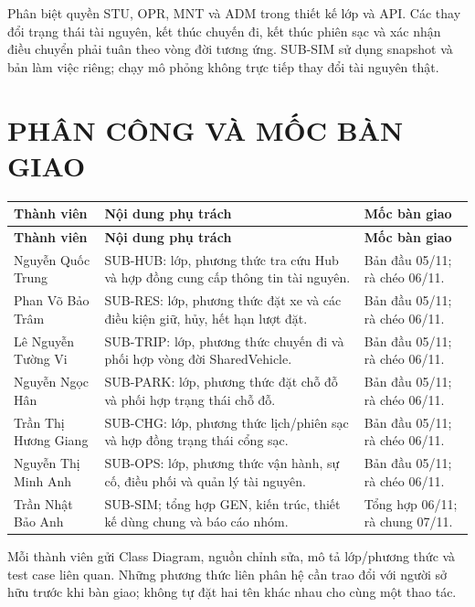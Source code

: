\documentclass[10pt,a4paper]{article}
\begin{document}
Phân biệt quyền STU, OPR, MNT và ADM trong thiết kế lớp và API. Các thay đổi trạng thái tài nguyên, kết thúc chuyến đi, kết thúc phiên sạc và xác nhận điều chuyển phải tuân theo vòng đời tương ứng. SUB-SIM sử dụng snapshot và bản làm việc riêng; chạy mô phỏng không trực tiếp thay đổi tài nguyên thật.

\section{PHÂN CÔNG VÀ MỐC BÀN GIAO}
\begin{longtable}{|L{35mm}|L{66mm}|L{45mm}|}
\hline
{}\textbf{Thành viên} & \textbf{Nội dung phụ trách} & \textbf{Mốc bàn giao}\\\hline
\endfirsthead
\hline\textbf{Thành viên} & \textbf{Nội dung phụ trách} & \textbf{Mốc bàn giao}\\\hline\endhead
Nguyễn Quốc Trung & SUB-HUB: lớp, phương thức tra cứu Hub và hợp đồng cung cấp thông tin tài nguyên. & Bản đầu 05/11; rà chéo 06/11.\\\hline
Phan Võ Bảo Trâm & SUB-RES: lớp, phương thức đặt xe và các điều kiện giữ, hủy, hết hạn lượt đặt. & Bản đầu 05/11; rà chéo 06/11.\\\hline
Lê Nguyễn Tường Vi & SUB-TRIP: lớp, phương thức chuyến đi và phối hợp vòng đời SharedVehicle. & Bản đầu 05/11; rà chéo 06/11.\\\hline
Nguyễn Ngọc Hân & SUB-PARK: lớp, phương thức đặt chỗ đỗ và phối hợp trạng thái chỗ đỗ. & Bản đầu 05/11; rà chéo 06/11.\\\hline
Trần Thị Hương Giang & SUB-CHG: lớp, phương thức lịch/phiên sạc và hợp đồng trạng thái cổng sạc. & Bản đầu 05/11; rà chéo 06/11.\\\hline
Nguyễn Thị Minh Anh & SUB-OPS: lớp, phương thức vận hành, sự cố, điều phối và quản lý tài nguyên. & Bản đầu 05/11; rà chéo 06/11.\\\hline
Trần Nhật Bảo Anh & SUB-SIM; tổng hợp GEN, kiến trúc, thiết kế dùng chung và báo cáo nhóm. & Tổng hợp 06/11; rà chung 07/11.\\\hline
\end{longtable}

Mỗi thành viên gửi Class Diagram, nguồn chỉnh sửa, mô tả lớp/phương thức và test case liên quan. Những phương thức liên phân hệ cần trao đổi với người sở hữu trước khi bàn giao; không tự đặt hai tên khác nhau cho cùng một thao tác.
\end{document}
